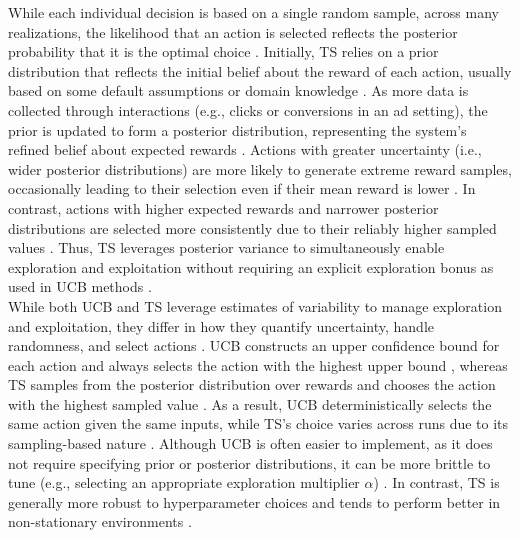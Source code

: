 \documentclass[manuscript,review,screen]{acmart}
\begin{document}
While each individual decision is based on a single random sample, across many realizations, the likelihood that an action is selected reflects the posterior probability that it is the optimal choice \cite{russo2018tutorial}. Initially, TS relies on a prior distribution that reflects the initial belief about the reward of each action, usually based on some default assumptions or domain knowledge \cite{russo2018tutorial}. As more data is collected through interactions (e.g., clicks or conversions in an ad setting), the prior is updated to form a posterior distribution, representing the system’s refined belief about expected rewards \cite{russo2018tutorial}. Actions with greater uncertainty (i.e., wider posterior distributions) are more likely to generate extreme reward samples, occasionally leading to their selection even if their mean reward is lower \cite{russo2018tutorial}. In contrast, actions with higher expected rewards and narrower posterior distributions are selected more consistently due to their reliably higher sampled values \cite{russo2018tutorial}. Thus, TS leverages posterior variance to simultaneously enable exploration and exploitation without requiring an explicit exploration bonus as used in UCB methods \cite{russo2018tutorial}. \\

While both UCB and TS leverage estimates of variability to manage exploration and exploitation, they differ in how they quantify uncertainty, handle randomness, and select actions \cite{Sutton1998, russo2018tutorial}. UCB constructs an upper confidence bound for each action and always selects the action with the highest upper bound \cite{auer2002finite}, whereas TS samples from the posterior distribution over rewards and chooses the action with the highest sampled value \cite{russo2018tutorial}. As a result, UCB deterministically selects the same action given the same inputs, while TS’s choice varies across runs due to its sampling-based nature \cite{russo2018tutorial}. Although UCB is often easier to implement, as it does not require specifying prior or posterior distributions, it can be more brittle to tune (e.g., selecting an appropriate exploration multiplier $\alpha$) \cite{Sutton1998, auer2002finite, li2010contextual}. In contrast, TS is generally more robust to hyperparameter choices and tends to perform better in non-stationary environments \cite{chapelle2011empirical, russo2018tutorial}.
\end{document}
